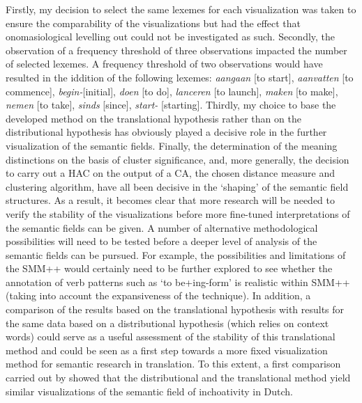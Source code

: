 Firstly, my decision to select the same lexemes for each visualization was taken to ensure the comparability of the visualizations but had the effect that onomasiological levelling out could not be investigated as such. Secondly, the observation of a frequency threshold of three observations impacted the number of selected lexemes. A frequency threshold of two observations would have resulted in the iddition of the following lexemes: \textit{aangaan} [to start], \textit{aanvatten} [to commence], \textit{begin-}[initial], \textit{doen} [to do], \textit{lanceren} [to launch], \textit{maken} [to make], \textit{nemen} [to take], \textit{sinds} [since], \textit{start-} [starting]. Thirdly, my choice to base the developed method on the translational hypothesis rather than on the distributional hypothesis has obviously played a decisive role in the further visualization of the semantic fields. Finally, the determination of the meaning distinctions on the basis of cluster significance, and, more generally, the decision to carry out a HAC on the output of a CA, the chosen distance measure and clustering algorithm, have all been decisive in the ‘shaping’ of the semantic field structures. As a result, it becomes clear that more research will be needed to verify the stability of the visualizations before more fine-tuned interpretations of the semantic fields can be given. A number of alternative methodological possibilities will need to be tested before a deeper level of analysis of the semantic fields can be pursued. For example, the possibilities and limitations of the SMM++ would certainly need to be further explored to see whether the annotation of verb patterns such as ‘to be+ing-form’ is realistic within SMM++ (taking into account the expansiveness of the technique). In addition, a comparison of the results based on the translational hypothesis with results for the same data based on a distributional hypothesis (which relies on context words) could serve as a useful assessment of the stability of this translational method and could be seen as a first step towards a more fixed visualization method for semantic research in translation. To this extent, a first comparison carried out by \citet{vandevoorde_distributional_2016} showed that the distributional and the translational method yield similar visualizations of the semantic field of inchoativity in Dutch.

